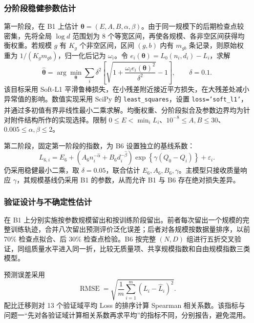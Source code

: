 \documentclass[bwprint]{gmcmthesis}
\begin{document}
        \subsubsection{分阶段稳健参数估计}  %
        第一阶段，在 B1 上估计 $\bm\theta=(E,A,B,\alpha,\beta)$。由于同一规模下的后期检查点较密集，先将全局 $\log d$ 范围划为 8 个等宽区间，再使各规模、各非空区间获得均衡权重。若规模 $g$ 有 $K_g$ 个非空区间，区间 $(g,b)$ 内有 $m_{gb}$ 条记录，则原始权重为 $1/(K_gm_{gb})$，归一化后记为 $\omega_i$。令 $e_i(\bm\theta)=L_0(n_i,d_i)-L_i$，求解
        \begin{equation}
         \widehat{\bm\theta}=\arg\min_{\bm\theta}
         \sum_i\delta^2\left[\sqrt{1+\frac{\omega_i e_i(\bm\theta)^2}{\delta^2}}-1\right],
         \qquad \delta=0.1.
         \label{eq:p2_fit}
        \end{equation}
        该目标采用 Soft-L1 平滑鲁棒损失，在小残差附近接近平方损失，在大残差处减小异常值的影响。数值实现采用 SciPy 的 \texttt{least\_squares}，设置 \texttt{loss='soft\_l1'}，并通过多初值有界非线性最小二乘求解\textsuperscript{\cite{virtanen2020scipy}}。均衡权重、分阶段拟合及参数边界均为针对附件结构所作的实现选择。限制 $0\leq E<\min_iL_i$、$10^{-8}\leq A,B\leq30$、$0.005\leq\alpha,\beta\leq2$。
        
        第二阶段，固定第一阶段的指数，为 B6 设置独立的基线系数：
        \begin{equation}
         L_{6,i}=E_6+\left(A_6n_i^{-\widehat\alpha}+B_6d_i^{-\widehat\beta}\right)
         \exp\!\left\{\gamma(Q_0-Q_i)\right\}+\varepsilon_i.
         \label{eq:p2_fit_quality}
        \end{equation}
        仍采用稳健最小二乘，取 $\delta=0.05$，联合估计 $E_6,A_6,B_6,\gamma$。主模型只接收质量响应 $\gamma$，其规模基线仍采用 B1 的参数，从而允许 B1 与 B6 存在绝对损失差异。
    
        \subsubsection{验证设计与不确定性估计}  %
        在 B1 上分别实施按参数规模留出和按训练阶段留出。前者每次留出一个规模的完整训练轨迹，合并八次留出预测评价泛化误差；后者对各规模按数据量排序，以前 70\% 检查点拟合、后 30\% 检查点检验。B6 按完整 $(N,D)$ 组进行五折交叉验证，同组质量水平进入同一折，比较无质量项、共享规模指数和自由规模指数三类模型。
        
        预测误差采用
        \begin{equation}
         \operatorname{RMSE}=\sqrt{\frac1m\sum_{i=1}^{m}(L_i-\widehat L_i)^2}.
         \label{eq:p2_rmse}
        \end{equation}
        配比迁移则对 13 个验证域平均 Loss 的排序计算 Spearman 相关系数。该指标与问题一“先对各验证域计算相关系数再求平均”的指标不同，分别报告，避免混用。
        
\end{document}
